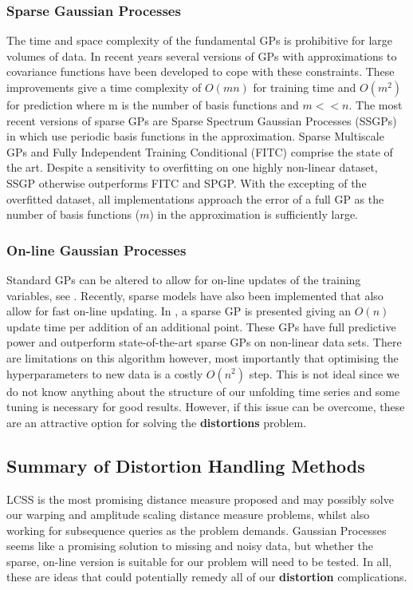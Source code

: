 	\subsubsection{Sparse Gaussian Processes}
	The time and space complexity of the fundamental GPs is prohibitive for large volumes of data. In recent years several versions of GPs with approximations to covariance functions have been developed to cope with these constraints. These improvements give a time complexity of $O(mn)$ for training time and $O(m^{2})$ for prediction where m is the number of basis functions and $m << n$. The most recent versions of sparse GPs are Sparse Spectrum Gaussian Processes (SSGPs) in \citep{rasmussen2010ssgpr} which use periodic basis functions in the approximation. Sparse Multiscale GPs \citep{walder2008sparse} and Fully Independent Training Conditional (FITC) \citep{snelson2005sgppi} comprise the state of the art. Despite a sensitivity to overfitting on one highly non-linear dataset, SSGP otherwise outperforms FITC and SPGP. With the excepting of the overfitted dataset, all implementations approach the error of a full GP as the number of basis functions ($m$) in the approximation is sufficiently large.

	\subsubsection{On-line Gaussian Processes}
	Standard GPs can be altered to allow for on-line updates of the training variables, see \citep{osborne2007gaussian}. Recently, sparse models have also been implemented that also allow for fast on-line updating. In \citep{ranganathan2011online}, a sparse GP is presented giving an $O(n)$ update time per addition of an additional point. These GPs have full predictive power and outperform state-of-the-art sparse GPs on non-linear data sets. There are limitations on this algorithm however, most importantly that optimising the hyperparameters to new data is a costly $O(n^{2})$ step. This is not ideal since we do not know anything about the structure of our unfolding time series and some tuning is necessary for good results. However, if this issue can be overcome, these are an attractive option for solving the \textbf{distortions} problem.

	\subsection{Summary of Distortion Handling Methods}
	LCSS is the most promising distance measure proposed and may possibly solve our warping and amplitude scaling distance measure problems, whilst also working for subsequence queries as the problem demands. Gaussian Processes seems like a promising solution to missing and noisy data, but whether the sparse, on-line version is suitable for our problem will need to be tested. In all, these are ideas that could potentially remedy all of our \textbf{distortion} complications.
	
